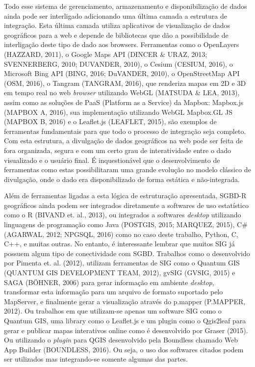 		Todo esse sistema de gerenciamento, armazenamento e disponibilização de dados ainda pode ser interligado adicionando uma última camada a estrutura de integração. Esta última camada utiliza aplicativos de visualização de dados geográficos para a web e depende de bibliotecas que dão a possibilidade de interligação deste tipo de dado aos browsers. Ferramentas como o OpenLayers (HAZZARD, 2011), o Google Maps API (DINCER \& URAZ, 2013; SVENNERBERG, 2010; DUVANDER, 2010), o Cesium (CESIUM, 2016), o Microsoft Bing API (BING, 2016; DuVANDER, 2010), o OpenStreetMap API (OSM, 2016), o Tangram (TANGRAM, 2016), que renderiza mapas em 2D e 3D em tempo real no web \textit{browser} utilizando WebGL (MATSUDA \& LEA, 2013),  assim como as soluções de PaaS (Platform as a Service) da Mapbox: Mapbox.js (MAPBOX A, 2016), sua implementação utilizando WebGL Mapbox.GL JS (MAPBOX B, 2016) e o Leaflet.js (LEAFLET, 2015), são exemplos de ferramentas fundamentais para que todo o processo de integração seja completo. Com esta estrutura, a divulgação de dados geográficos na web pode ser feita de fora organizada, segura e com um certo grau de interatividade entre o dado visualizado e o usuário final. É inquestionável que o desenvolvimento de ferramentas como estas possibilitaram uma grande evolução no modelo clássico de divulgação, onde o dado era disponibilizado de forma estática e não-integrada.
		
		Além de ferramentas ligadas a esta lógica de estruturação apresentada, SGBD-R geográficos ainda podem ser integrados diretamente a softwares de uso estatístico como o R (BIVAND et. al., 2013), ou integrados a softwares \textit{desktop} utilizando linguagens de programação como Java (POSTGIS, 2015; MARQUEZ, 2015), C\# (AGARWAL, 2012; NPGSQL, 2016) como no caso deste trabalho, Python, C, C++, e muitas outras. No entanto, é interessante lembrar que muitos SIG já possuem algum tipo de conectividade com SGBD. Trabalhos como o desenvolvido por Pimenta et. al. (2012), utilizam ferramentas de SIG como o Quantum GIS (QUANTUM GIS DEVELOPMENT TEAM, 2012), gvSIG (GVSIG, 2015) e SAGA (BÖHNER, 2006) para gerar informação em ambiente \textit{desktop}, transformar esta informação para um arquivo de formato suportado pelo MapServer, e finalmente gerar a visualização através do p.mapper (P.MAPPER, 2012). Ou trabalhos em que utilizam-se apenas um software SIG como o Quantum GIS, uma library como o Leaflet.js e um plugin como o Qgis2leaf para gerar e publicar mapas interativos online como é desenvolvido por Graser (2015). Ou utilizando o \textit{plugin} para QGIS desenvolvido pela Boundless chamado Web App Builder (BOUNDLESS, 2016). Ou seja, o uso dos softwares citados podem ser utilizados mas integrando-se somente algumas das partes.
		
